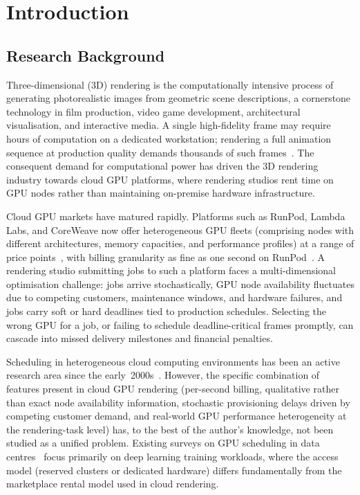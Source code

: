 \chapter{Introduction}
\label{chap:intro}

\section{Research Background}
\label{sec:research-background}

Three-dimensional (3D) rendering is the computationally intensive process of generating photorealistic images from geometric scene descriptions, a cornerstone technology in film production, video game development, architectural visualisation, and interactive media. A single high-fidelity frame may require hours of computation on a dedicated workstation; rendering a full animation sequence at production quality demands thousands of such frames~\cite{christensen2016path}. The consequent demand for computational power has driven the 3D rendering industry towards cloud GPU platforms, where rendering studios rent time on GPU nodes rather than maintaining on-premise hardware infrastructure.

Cloud GPU markets have matured rapidly. Platforms such as RunPod, Lambda Labs, and CoreWeave now offer heterogeneous GPU fleets (comprising nodes with different architectures, memory capacities, and performance profiles) at a range of price points~\cite{runpod2026podspricing,coreweave2026pricing,lambda2026pricing}, with billing granularity as fine as one second on RunPod~\cite{runpod2026podspricing}. A rendering studio submitting jobs to such a platform faces a multi-dimensional optimisation challenge: jobs arrive stochastically, GPU node availability fluctuates due to competing customers, maintenance windows, and hardware failures, and jobs carry soft or hard deadlines tied to production schedules. Selecting the wrong GPU for a job, or failing to schedule deadline-critical frames promptly, can cascade into missed delivery milestones and financial penalties.

Scheduling in heterogeneous cloud computing environments has been an active research area since the early~2000s~\cite{braun2001comparison,topcuoglu2002heft}. However, the specific combination of features present in cloud GPU rendering (per-second billing, qualitative rather than exact node availability information, stochastic provisioning delays driven by competing customer demand, and real-world GPU performance heterogeneity at the rendering-task level) has, to the best of the author's knowledge, not been studied as a unified problem. Existing surveys on GPU scheduling in data centres~\cite{ye2024deep} focus primarily on deep learning training workloads, where the access model (reserved clusters or dedicated hardware) differs fundamentally from the marketplace rental model used in cloud rendering.

